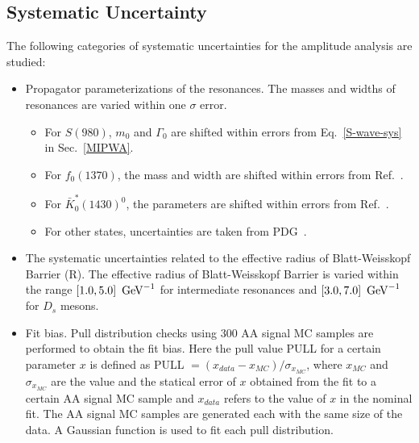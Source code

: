 \documentclass[aps,prd,twocolumn,showpacs,amsmath,amssymb]{revtex4-1}
\begin{document}
\subsection{Systematic Uncertainty}
\label{AA-sys}
The following categories of systematic uncertainties for the amplitude analysis are studied:

\begin{itemize}
    \item \uppercase\expandafter{} Propagator parameterizations of the resonances. 
        The masses and widths of resonances are varied within one $\sigma$ error.
        \begin{itemize}
            \item For $S(980)$, $m_{0}$ and $\Gamma_{0}$ are shifted within errors from Eq.~\ref{S-wave-sys} in Sec.~\ref{MIPWA}.
            \item For $f_{0}(1370)$, the mass and width are shifted within errors from Ref.~\cite{para-f01370}.
            \item For $\bar{K}^{*}_{0}(1430)^{0}$, the parameters are shifted within errors from Ref.~\cite{CLEO-Flatte}.
            \item For other states, uncertainties are taken from PDG~\cite{PDG}.
        \end{itemize}
    \item \uppercase\expandafter{} The systematic uncertainties related to the effective radius of Blatt-Weisskopf Barrier (R). The effective radius of Blatt-Weisskopf Barrier is varied within the range $\left[1.0, 5.0\right] \ {\rm GeV}^{-1}$ for intermediate resonances and  $\left[3.0, 7.0\right] \ {\rm GeV}^{-1}$ for $D_{s}$ mesons. 
    \item \uppercase\expandafter{} Fit bias. 
        Pull distribution checks using 300 AA signal MC samples are performed to obtain the fit bias. 
        Here the pull value PULL for a certain parameter $x$ is defined as PULL $= (x_{data} - x_{MC})/\sigma_{x_{MC}}$,
        where $x_{MC}$ and $\sigma_{x_{MC}}$ are the value and the statical error of $x$ obtained from the fit to a certain AA signal MC sample and $x_{data}$ refers to the value of $x$ in the nominal fit.
        The AA signal MC samples are generated each with the same size of the data. 
        A Gaussian function is used to fit each pull distribution.

\end{itemize}
\end{document}

